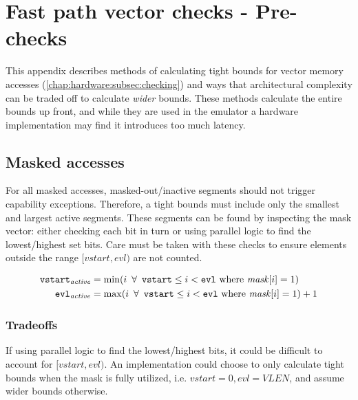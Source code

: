 \chapter{Fast path vector checks - Pre-checks}\label{appx:fastpathfull}
This appendix describes methods of calculating tight bounds for vector memory accesses (\cref{chap:hardware:subsec:checking}) and ways that architectural complexity can be traded off to calculate \emph{wider} bounds.
These methods calculate the entire bounds up front, and while they are used in the emulator a hardware implementation may find it introduces too much latency.

\newcommand{\vstart}{\code{vstart}}
\newcommand{\vstartactive}{\code{vstart}_{\mathit{active}}}
\newcommand{\evl}{\code{evl}}
\newcommand{\evlactive}{\code{evl}_{\mathit{active}}}
\newcommand{\baseaddr}{\mathit{base}}


\section{Masked accesses}
For all masked accesses, masked-out/inactive segments should not trigger capability exceptions.
Therefore, a tight bounds must include only the smallest and largest active segments.
These segments can be found by inspecting the mask vector: either checking each bit in turn or using parallel logic to find the lowest/highest set bits.
Care must be taken with these checks to ensure elements outside the range $[\textit{vstart}, \textit{evl})$ are not counted.

\begin{align}
    \vstartactive{} &= \min(i\ \forall\ \vstart{} \le i < \evl{}\ \text{where}\ \mathit{mask}[i] = 1) \\
    \evlactive{}    &= \max(i\ \forall\ \vstart{} \le i < \evl{}\ \text{where}\ \mathit{mask}[i] = 1) + 1
\end{align}

\subsection*{Tradeoffs}
If using parallel logic to find the lowest/highest bits, it could be difficult to account for $[\textit{vstart}, \textit{evl})$.
An implementation could choose to only calculate tight bounds when the mask is fully utilized, i.e. $\textit{vstart} = 0, \textit{evl} = \textit{VLEN}$, and assume wider bounds otherwise.

